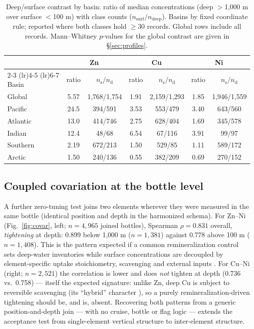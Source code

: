 \documentclass[11pt]{article}
\begin{document}
\begin{table}[!t]
\centering
\caption{Deep/surface contrast by basin: ratio of median concentrations
(deep $>$1,000 m over surface $<$100 m) with class counts
($n_{\mathrm{surf}}/n_{\mathrm{deep}}$). Basins by fixed coordinate rule;
reported where both classes hold $\ge$30 records. Global rows include all
records. Mann--Whitney $p$-values for the global contrast are given in
\S\ref{sec:profiles}.}
\label{tab:basins}
\small
\begin{tabular}{lcccccc}
\toprule
 & \multicolumn{2}{c}{Zn} & \multicolumn{2}{c}{Cu} & \multicolumn{2}{c}{Ni} \\
\cmidrule(lr){2-3} \cmidrule(lr){4-5} \cmidrule(lr){6-7}
Basin & ratio & $n_{\mathrm{s}}/n_{\mathrm{d}}$ & ratio & $n_{\mathrm{s}}/n_{\mathrm{d}}$ & ratio & $n_{\mathrm{s}}/n_{\mathrm{d}}$ \\
\midrule
Global & 5.57 & 1,768/1,754 & 1.91 & 2,159/1,293 & 1.85 & 1,946/1,559 \\
Pacific & 24.5 & 394/591 & 3.53 & 553/479 & 3.40 & 643/560 \\
Atlantic & 13.0 & 414/746 & 2.75 & 628/404 & 1.69 & 345/578 \\
Indian & 12.4 & 48/68 & 6.54 & 67/116 & 3.91 & 99/97 \\
Southern & 2.19 & 672/213 & 1.50 & 529/85 & 1.11 & 589/172 \\
Arctic & 1.50 & 240/136 & 0.55 & 382/209 & 0.69 & 270/152 \\
\bottomrule
\end{tabular}
\end{table}

\subsection{Coupled covariation at the bottle level}
\label{sec:covar}
A further zero-tuning test joins two elements wherever they were measured
in the same bottle (identical position and depth in the harmonized
schema). For Zn--Ni (Fig.~\ref{fig:covar}, left; $n{=}4{,}965$ joined
bottles), Spearman $\rho = 0.831$ overall, \emph{tightening} at depth:
0.899 below 1,000 m ($n{=}1{,}381$) against 0.778 above 100 m
($n{=}1{,}408$). This is the pattern expected if a common
remineralization control sets deep-water inventories while surface
concentrations are decoupled by element-specific uptake stoichiometry,
scavenging and external inputs \cite{bruland1980,morel2003}. For Cu--Ni
(right; $n{=}2{,}521$) the correlation is lower and does \emph{not}
tighten at depth (0.736 vs.\ 0.758) --- itself the expected signature:
unlike Zn, deep Cu is subject to reversible scavenging (its ``hybrid''
character \cite{morel2003}), so a purely remineralization-driven
tightening should be, and is, absent. Recovering both patterns from a
generic position-and-depth join --- with no cruise, bottle or flag logic
--- extends the acceptance test from single-element vertical structure to
inter-element structure.
\end{document}
